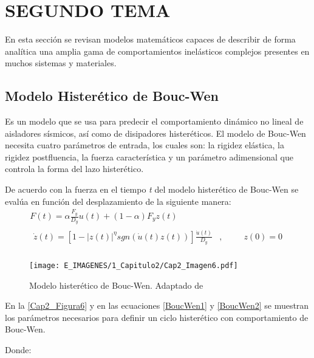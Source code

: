 \section{SEGUNDO TEMA}

En esta sección se revisan modelos matemáticos capaces de describir de forma analítica una amplia gama de comportamientos inelásticos complejos presentes en muchos sistemas y materiales.

\subsection{Modelo Histerético de Bouc-Wen} \label{subsection:MHBW}

Es un modelo que se usa para predecir el comportamiento dinámico no lineal de aisladores sísmicos, así como de disipadores histeréticos. El modelo de Bouc-Wen necesita cuatro parámetros de entrada, los cuales son: la rigidez elástica, la rigidez postfluencia, la fuerza característica y un parámetro adimensional que controla la forma del lazo histerético.

De acuerdo con \citet{Charalampakis2010} la fuerza en el tiempo \textit{t} del modelo histerético de Bouc-Wen se evalúa en función del desplazamiento de la siguiente manera:
\begin{gather}
	F(t)=\alpha \frac{F_{y}}{D_{y}}u(t)+(1-\alpha)F_{y}z(t)				\label{BoucWen1} \\
	\begin{aligned}
		\dot{z}(t)=\left[1-\left|z(t)\right |^{\eta}sgn(\dot{u}(t)z(t))\right]\frac{\dot{u}(t)}{D_{y}} & , & \hspace{1em} & z(0)=0 \\
	\end{aligned}		\label{BoucWen2}
\end{gather}

\begin{figure}[!h]
	\centering
	\texttt{[image: E\_IMAGENES/1\_Capitulo2/Cap2\_Imagen6.pdf]}
	\caption[Modelo histerético de Bouc-Wen]{\centering\footnotesize Modelo histerético de Bouc-Wen. Adaptado de \citet{Charalampakis2010}}
	\label{Cap2_Figura6}
\end{figure}

En la \autoref{Cap2_Figura6} y en las ecuaciones \ref{BoucWen1} y \ref{BoucWen2} se muestran los parámetros necesarios para definir un ciclo histerético con comportamiento de Bouc-Wen.

Donde:

